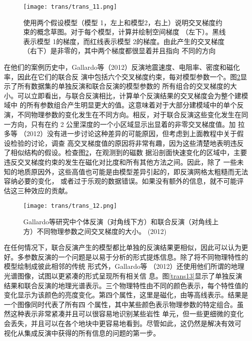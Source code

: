 \begin{figure}
    \centering
    \texttt{[image: trans/trans\_11.png]}
    \setcounter{figure}{3}
    \caption{使用两个假设模型（模型 1，左上和模型2，右上）说明交叉梯度约束的概念草图。对于每个模型，计算并绘制空间梯度 （左下）。黑线表示模型 1的梯度，而红线表示模型 2的梯度。由此产生的交叉梯度（右下）是非零的，其中两个梯度都很显着并且指向 不同的方向}\label{trans11}

\end{figure}

在他们的案例历史中，Gallardo等（2012）反演地震速度、电阻率、密度和磁化率，因此在它们的联合反 演中包括六个交叉梯度约束，每对模型参数一个。图\ref{trans12}显示了所有数据集的单独反演和联合反演的模型参数的 所有组合的交叉梯度的大小。可以立即看出，与联合反演相比，计算单个反演结果的交叉梯度会为整个建模域中 的所有参数组合产生明显更大的值。这意味着对于大部分建模域中的单个反演，不同物理参数的变化发生在不同方向。相反，对于联合反演这些变化发生在同一方向，只有在约 2 公里深度的一个小区域显示出显着的非零交叉梯度值。加 拉多等 （2012）没有进一步讨论这种差异的可能原因，但考虑到上面教程中关于假设检验的讨论，调查 高交叉梯度值的原因将非常有趣，因为这些清楚地表明违反了相似结构的假设。检查图\ref{trans12}，在观测到的磁数 据沿剖面快速变化的区域中，主要违反交叉梯度约束的发生在磁化对比度和所有其他方法之间。因此，除了 一些未知的地质原因外，这些高值也可能是由模型差异引起的，即反演网格太粗糙而无法容纳必要的变化， 或者过于乐观的数据错误。如果没有额外的信息，就不可能评估这三种效应的贡献。

\begin{figure}[H]
    \centering
    \texttt{[image: trans/trans\_12.png]}
    \caption{Gallardo等研究中个体反演（对角线下方）和联合反演（对角线上方）不同物理参数之间交叉梯度的大小。 (2012)}\label{trans12}
    \setcounter{figure}{2}
\end{figure}


在任何情况下，联合反演产生的模型都比单独的反演结果更相似，因此可以认为更好。多参数反演的一个问题是以易于分析的形式提炼信息。除了将不同物理特性的模型绘制成彼此相邻的传统 形式外，Gallardo等 （2012）还使用他们所谓的地理光谱图像，试图以更紧凑的形式呈现所有相关信 息。图\ref{trans13}显示了单独反演结果和联合反演的地理光谱表示。三个物理特性由不同的颜色表示，每个特性值的 变化显示为该颜色的亮度变化。第四个属性，这里是磁化，由等高线表示。结果是一个图像同时代表了所有四 个属性，其中某些颜色表示物理参数的特定组合。虽然这种表示非常紧凑并且可以很容易地识别某些岩性 单元，但一些更细微的变化会丢失，并且可以在各个地块中更容易地看到。尽管如此，这仍然是解决有效可 视化从集成反演中获得的所有信息的问题的第一步。

